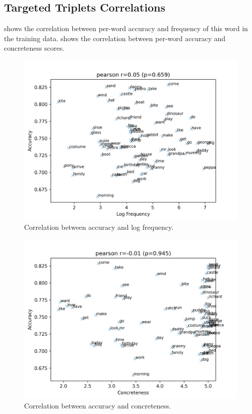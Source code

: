 \subsection{Targeted Triplets Correlations}\label{app:targeted_triplets_correlations}

 shows the correlation between per-word accuracy and frequency of this word in the training data.
 shows the correlation between per-word accuracy and concreteness scores.





\begin{figure}
  \centering
  \includegraphics[width=\textwidth]{results/targeted_triplets/results_correlation_frequency_acc.png}
  \caption{Correlation between accuracy and log frequency.}
  \label{fig:results_correlation_frequency_acc}
\end{figure}

\begin{figure}
  \centering
  \includegraphics[width=\textwidth]{results/targeted_triplets/results_correlation_concreteness_acc.png}
  \caption{Correlation between accuracy and concreteness.}
  \label{fig:results_correlation_concreteness_acc}
\end{figure}

